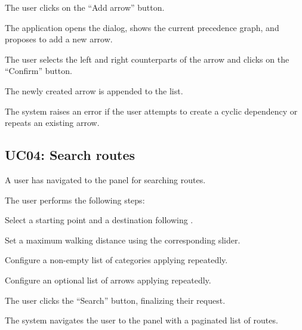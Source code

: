 
\begin{ucenumerate}
\item The user clicks on the ``Add arrow'' button.
\item The application opens the dialog, shows the current precedence graph, and proposes to add a new arrow.
\item The user selects the left and right counterparts of the arrow and clicks on the ``Confirm'' button.
\end{ucenumerate}


\begin{ucitemize}
\item The newly created arrow is appended to the list.
\end{ucitemize}


\begin{ucitemize}
\item The system raises an error if the user attempts to create a cyclic dependency or repeats an existing arrow.
\end{ucitemize}

\subsection{UC04: Search routes}\label{sssec:uc-search-routes}


\begin{ucitemize}
\item A user has navigated to the panel for searching routes.
\end{ucitemize}


\begin{ucenumerate}
\item The user performs the following steps:
\begin{ucitemize}
\item Select a starting point and a destination following \emph{}.
\item Set a maximum walking distance using the corresponding slider.
\item Configure a non-empty list of categories applying \emph{} repeatedly.
\item Configure an optional list of arrows applying \emph{} repeatedly.
\end{ucitemize}
\item The user clicks the ``Search'' button, finalizing their request.
\item The system navigates the user to the panel with a paginated list of routes.
\end{ucenumerate}

